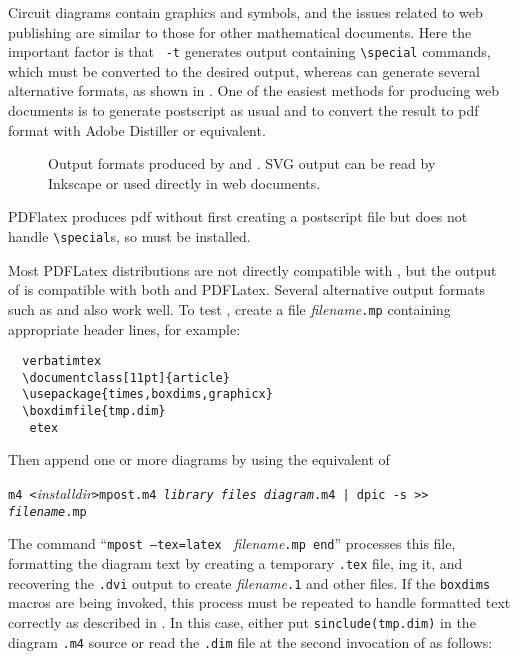 
Circuit diagrams contain graphics and symbols, and the issues related to
web publishing are similar to those for other mathematical documents.
Here the important factor is that \gpic\ {\tt -t} generates output
containing \tpic \verb|\special| commands, which must be converted
to the desired output, whereas \dpic can generate several alternative
formats, as shown in .
One of the easiest methods
for producing web documents is to generate postscript as usual and to
convert the result to pdf format with Adobe Distiller or equivalent.
\begin{figure}[h!t]
   
   \caption{Output formats produced by  and \dpic.
      SVG output can be read by Inkscape or used directly in web documents.}
   \label{Workflow}
   \end{figure}

PDFlatex produces pdf without first creating a postscript file
but does not handle \tpic \verb|\special|s, so \dpic must be
installed.

Most PDFLatex distributions are not directly compatible with \PSTricks, but
the \TPGF output of \dpic is compatible with both \latex and PDFLatex.
Several alternative \dpic output formats such as
\mfpic and \MetaPost also work well.
To test \MetaPost, create a file {\sl filename}{\tt .mp}
containing appropriate header lines, for example:
\begin{verbatim}
  verbatimtex
  \documentclass[11pt]{article}
  \usepackage{times,boxdims,graphicx}
  \boxdimfile{tmp.dim}
   etex
\end{verbatim}
Then append one or more diagrams by using the equivalent of

{\tt m4 <}{\sl installdir}{\tt >mpost.m4 {\sl library files}
  {\sl diagram}.m4 | dpic -s >> {\sl filename}.mp}

The command ``{\tt mpost --tex=latex } {\sl filename}{\tt .mp end}''
processes this file, formatting the diagram text by creating a
temporary {\tt .tex} file, \latex{}ing it, and recovering the {\tt .dvi}
output to create {\sl filename}{\tt .1} and other files.  If the {\tt boxdims}
macros are being invoked, this process must be repeated to handle
formatted text correctly as described in .
In this case, either put {\tt sinclude(tmp.dim)} in the diagram {\tt .m4}
source or read the {\tt .dim} file at the second invocation of
\Mfour as follows:

